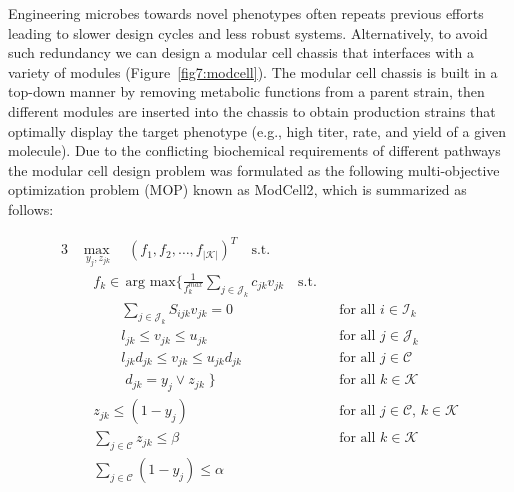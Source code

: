Engineering microbes towards novel phenotypes often repeats previous efforts leading to slower design cycles and less robust systems.
Alternatively, to avoid such redundancy we can design a modular cell chassis that interfaces with a variety of modules (Figure~\ref{fig7:modcell}).\citep{garcia2019, garcia2019b}
The modular cell chassis is built in a top-down manner by removing metabolic functions from a parent strain, then different modules are inserted into the chassis to obtain production strains that optimally display the target phenotype (e.g., high titer, rate, and yield of a given molecule).
Due to the conflicting biochemical requirements of different pathways %
the modular cell design problem was formulated as the following multi-objective optimization problem (MOP) known as ModCell2\citep{garcia2019}, which is summarized as follows:


\begin{alignat}{3}
    & \underset{ \; y_j, z_{jk}}{\max} \quad (f_1, f_2, \ldots, f_{|\mathcal{K}|})^T \quad \text{s.t.}  \label{eq7:of1} \\
    &  \quad f_k \in \, \text{arg }\underset{}{\text{max}} \Bigg\{ \frac{1}{f_k^{max}}\sum_{j \in \mathcal{J}_k} c_{jk}  v_{jk} \quad \text{s.t.} \label{eq7:of2}\\
    & \quad \qquad \sum_{j\in \mathcal{J}_k}S_{ijk}v_{jk} = 0 && \text{for all } i \in \mathcal{I}_k  \label{eq7:mb}\\
    & \quad \qquad  l_{jk} \le v_{jk} \le u_{jk}  && \text{for all } j \in \mathcal{J}_k \label{eq7:rb}\\
    & \quad \qquad  l_{jk} d_{jk} \le v_{jk} \le u_{jk} d_{jk} && \text{for all } j \in \mathcal{C} \label{eq7:db}\\
    & \quad \qquad \; d_{jk} = y_j \lor z_{jk} \; \Bigg\} && \text{for all } k \in \mathcal{K} \label{eq7:defdjk} \\
    & \quad z_{jk}\le (1-y_j) && \text{for all } j \in \mathcal{C}, \, k \in \mathcal{K} \label{eq7:mr1}\\
    & \quad \sum_{j \in \mathcal{C}}z_{jk} \le \beta && \text{for all } k \in \mathcal{K} \label{eq7:mr2} \\
    & \quad \sum_{j \in \mathcal{C}} (1-y_j) \le \alpha \label{eq7:a}
\end{alignat}

